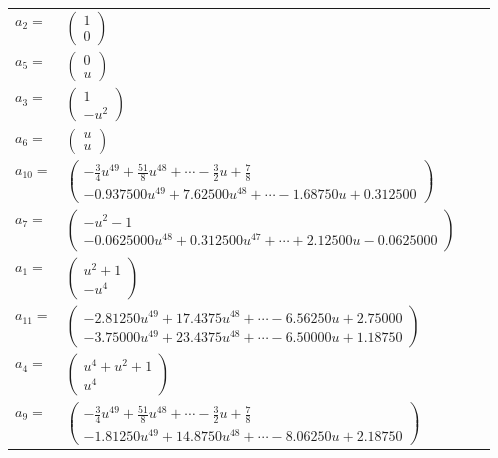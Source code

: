 \documentclass[1p]{elsarticle_modified}
\theoremstyle{definition}
\begin{document}
\begin{tabular}{m{7pt} m{180pt} m{7pt} m{180pt} }
\flushright $a_{2}=$&$\begin{pmatrix}1\\0\end{pmatrix}$ \\
\flushright $a_{5}=$&$\begin{pmatrix}0\\u\end{pmatrix}$ \\
\flushright $a_{3}=$&$\begin{pmatrix}1\\- u^2\end{pmatrix}$ \\
\flushright $a_{6}=$&$\begin{pmatrix}u\\u\end{pmatrix}$ \\
\flushright $a_{10}=$&$\begin{pmatrix}-\frac{3}{4} u^{49}+\frac{51}{8} u^{48}+\cdots-\frac{3}{2} u+\frac{7}{8}\\-0.937500 u^{49}+7.62500 u^{48}+\cdots-1.68750 u+0.312500\end{pmatrix}$ \\
\flushright $a_{7}=$&$\begin{pmatrix}- u^2-1\\-0.0625000 u^{48}+0.312500 u^{47}+\cdots+2.12500 u-0.0625000\end{pmatrix}$ \\
\flushright $a_{1}=$&$\begin{pmatrix}u^2+1\\- u^4\end{pmatrix}$ \\
\flushright $a_{11}=$&$\begin{pmatrix}-2.81250 u^{49}+17.4375 u^{48}+\cdots-6.56250 u+2.75000\\-3.75000 u^{49}+23.4375 u^{48}+\cdots-6.50000 u+1.18750\end{pmatrix}$ \\
\flushright $a_{4}=$&$\begin{pmatrix}u^4+u^2+1\\u^4\end{pmatrix}$ \\
\flushright $a_{9}=$&$\begin{pmatrix}-\frac{3}{4} u^{49}+\frac{51}{8} u^{48}+\cdots-\frac{3}{2} u+\frac{7}{8}\\-1.81250 u^{49}+14.8750 u^{48}+\cdots-8.06250 u+2.18750\end{pmatrix}$ \\

\end{tabular}
\end{document}
